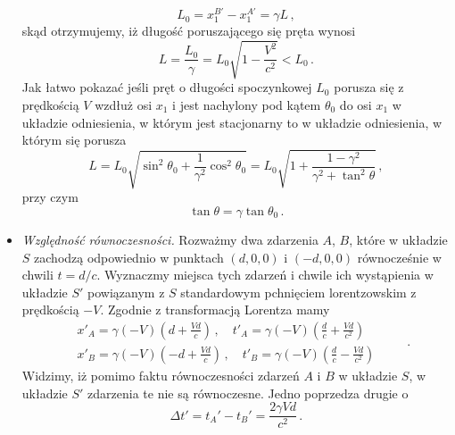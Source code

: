 \documentclass[../main.tex]{subfiles}
\begin{document}
\begin{itemize}
\begin{equation*}
        L_0=x_1^{B'}-x_1^{A'}=\gamma L\,,
    \end{equation*}
    skąd otrzymujemy, iż długość poruszającego się pręta wynosi
    \begin{equation*}
        L=\frac{L_0}{\gamma}=L_0\sqrt{1-\frac{V^2}{c^2}}<L_0\,.
    \end{equation*}
    Jak łatwo pokazać jeśli pręt o długości spoczynkowej \(L_0\) porusza się z prędkością \(V\) wzdłuż osi \(x_1\) i jest nachylony pod kątem \(\theta_0\) do osi \(x_1\) w układzie odniesienia, w którym jest stacjonarny to w układzie odniesienia, w którym się porusza
    \begin{equation*}
        L=L_0\sqrt{\sin^2\theta_0+\frac{1}{\gamma^2}\cos^2\theta_0}=L_0\sqrt{1+\frac{1-\gamma^2}{\gamma^2+\tan^2\theta}}\,,
    \end{equation*}
    przy czym
    \begin{equation*}
        \tan\theta=\gamma\tan\theta_0\,.
    \end{equation*}
    \item\textit{Względność równoczesności.} Rozważmy dwa zdarzenia \(A\), \(B\), które w układzie \(S\) zachodzą odpowiednio w punktach \((d,0,0)\) i \((-d,0,0)\) równocześnie w chwili \(t=d/c\). Wyznaczmy miejsca tych zdarzeń i chwile ich wystąpienia w układzie \(S'\) powiązanym z \(S\) standardowym pchnięciem lorentzowskim z prędkością \(-V\). Zgodnie z transformacją Lorentza mamy
    \begin{equation*}
        \begin{split}
            &x'_A=\gamma(-V)\left(d+\frac{Vd}{c}\right)\,,\quad t'_A=\gamma(-V)\left(\frac{d}{c}+\frac{Vd}{c^2}\right)\\
            &x'_B=\gamma(-V)\left(-d+\frac{Vd}{c}\right)\,,\quad t'_B=\gamma(-V)\left(\frac{d}{c}-\frac{Vd}{c^2}\right)
        \end{split}\quad\quad\,.
    \end{equation*}
    Widzimy, iż pomimo faktu równoczesności zdarzeń \(A\) i \(B\) w układzie \(S\), w układzie \(S'\) zdarzenia te nie są równoczesne. Jedno poprzedza drugie o
    \begin{equation*}
        \Delta t'=t_A'-t_B'=\frac{2\gamma Vd}{c^2}\,.
    \end{equation*}
\end{itemize}
\end{document}
